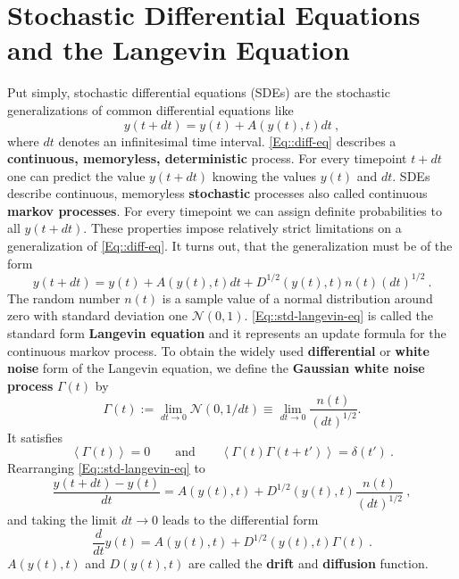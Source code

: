 	\section{Stochastic Differential Equations and the Langevin Equation}
	Put simply, stochastic differential equations (SDEs) are the stochastic generalizations of common differential equations like
	\begin{equation} \label{Eq::diff-eq}
		y(t + dt) =	y(t) + A(y(t), t) dt ~,
	\end{equation}
	where $dt$ denotes an infinitesimal time interval. 	\autoref{Eq::diff-eq} describes a \textbf{continuous, memoryless, deterministic} process. For every timepoint $t + dt$ one can predict the value $y(t+dt)$ knowing the values $y(t)$ and $dt$. SDEs describe continuous, memoryless \textbf{stochastic} processes also called continuous \textbf{markov processes}. For every timepoint we can assign definite probabilities to all $y(t + dt)$. These properties impose relatively strict limitations on a generalization of \autoref{Eq::diff-eq}. It turns out, that the generalization must be of the form \cite{gillespie1996mathematics}
	\begin{equation} \label{Eq::std-langevin-eq}
		y(t + dt) =	y(t) + A(y(t), t) dt + D^{1/2} \left(y(t), t\right) n(t) (dt)^{1/2}~.
	\end{equation}
	The random number $n(t)$ is a sample value of a normal distribution around zero with standard deviation one $\mathcal{N}(0,1)$. \autoref{Eq::std-langevin-eq} is called the standard form \textbf{Langevin equation} and it represents an update formula for the continuous markov process. To obtain the widely used \textbf{differential }or \textbf{white noise }form of the Langevin equation, we define the \textbf{Gaussian white noise process} $\Gamma(t)$ by
	\begin{equation}
		\Gamma(t) :=	\lim\limits_{dt \rightarrow 0} \mathcal{N}(0, 1/dt) \equiv \lim\limits_{dt \rightarrow 0} \frac{n(t)}{(dt)^{1/2}}.
	\end{equation}
	It satisfies
		\begin{equation}
		\left \langle \Gamma(t) \right \rangle = 0 \qquad \text{and} \qquad  			\left \langle \Gamma(t) \Gamma(t + t')\right \rangle =	\delta(t') ~.
	\end{equation}
	Rearranging \autoref{Eq::std-langevin-eq} to
	\begin{equation}
		\frac{y(t + dt) - y(t)}{dt} =	A(y(t), t) + D^{1/2} (y(t), t) \frac{n(t)}{(dt)^{1/2}} ~,
	\end{equation}
	and taking the limit $dt \rightarrow 0$ leads to the differential form
	\begin{equation} \label{Eq::Differential-Langevin-eq}
		\frac{d}{dt} y(t) =	A(y(t), t) + D^{1/2}(y(t), t) \Gamma(t)~.
	\end{equation}
	$A(y(t), t)$ and $D(y(t), t)$ are called the \textbf{drift} and \textbf{diffusion} function. 

